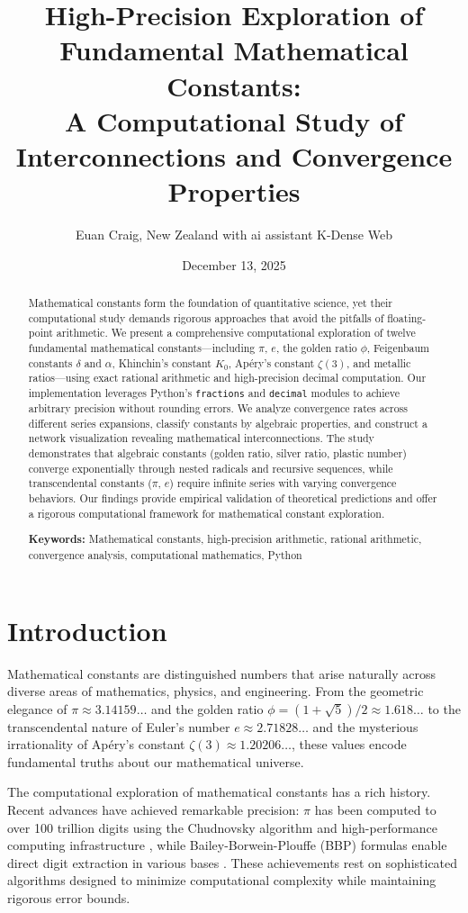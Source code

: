 \documentclass[11pt,a4paper]{article}
\title{High-Precision Exploration of Fundamental Mathematical Constants:\\A Computational Study of Interconnections and Convergence Properties}
\author{Euan Craig, New Zealand with ai assistant K-Dense Web}
\date{December 13, 2025}
\begin{document}
\maketitle

\begin{abstract}
Mathematical constants form the foundation of quantitative science, yet their computational study demands rigorous approaches that avoid the pitfalls of floating-point arithmetic. We present a comprehensive computational exploration of twelve fundamental mathematical constants—including $\pi$, $e$, the golden ratio $\phi$, Feigenbaum constants $\delta$ and $\alpha$, Khinchin's constant $K_0$, Apéry's constant $\zeta(3)$, and metallic ratios—using exact rational arithmetic and high-precision decimal computation. Our implementation leverages Python's \texttt{fractions} and \texttt{decimal} modules to achieve arbitrary precision without rounding errors. We analyze convergence rates across different series expansions, classify constants by algebraic properties, and construct a network visualization revealing mathematical interconnections. The study demonstrates that algebraic constants (golden ratio, silver ratio, plastic number) converge exponentially through nested radicals and recursive sequences, while transcendental constants ($\pi$, $e$) require infinite series with varying convergence behaviors. Our findings provide empirical validation of theoretical predictions and offer a rigorous computational framework for mathematical constant exploration.

\textbf{Keywords:} Mathematical constants, high-precision arithmetic, rational arithmetic, convergence analysis, computational mathematics, Python
\end{abstract}

\section{Introduction}

Mathematical constants are distinguished numbers that arise naturally across diverse areas of mathematics, physics, and engineering. From the geometric elegance of $\pi \approx 3.14159\ldots$ and the golden ratio $\phi = (1+\sqrt{5})/2 \approx 1.618\ldots$ to the transcendental nature of Euler's number $e \approx 2.71828\ldots$ and the mysterious irrationality of Apéry's constant $\zeta(3) \approx 1.20206\ldots$, these values encode fundamental truths about our mathematical universe.

The computational exploration of mathematical constants has a rich history. Recent advances have achieved remarkable precision: $\pi$ has been computed to over 100 trillion digits using the Chudnovsky algorithm and high-performance computing infrastructure \citep{pirecord2025}, while Bailey-Borwein-Plouffe (BBP) formulas enable direct digit extraction in various bases \citep{cloitre2025bbp}. These achievements rest on sophisticated algorithms designed to minimize computational complexity while maintaining rigorous error bounds.
\end{document}

